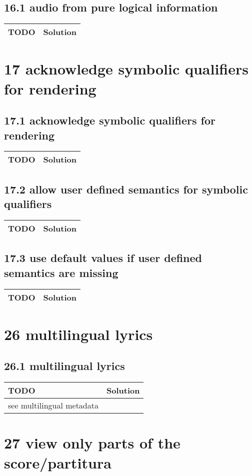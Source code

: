  \subsection*{16.1 audio from pure logical information}
 \begin{tabular}{|p{}|p{}|}
 \hline
 \textbf{TODO} &
 \textbf{Solution} 
\\
 \hline
 \end{tabular} \section*{17 acknowledge symbolic qualifiers for rendering}
 \subsection*{17.1 acknowledge symbolic qualifiers for rendering}
 \begin{tabular}{|p{}|p{}|}
 \hline
 \textbf{TODO} &
 \textbf{Solution} 
\\
 \hline
 \end{tabular} \subsection*{17.2 allow user defined semantics for symbolic qualifiers}
 \begin{tabular}{|p{}|p{}|}
 \hline
 \textbf{TODO} &
 \textbf{Solution} 
\\
 \hline
 \end{tabular} \subsection*{17.3 use default values if user defined semantics are missing}
 \begin{tabular}{|p{}|p{}|}
 \hline
 \textbf{TODO} &
 \textbf{Solution} 
\\
 \hline
 \end{tabular} \section*{26 multilingual lyrics}
 \subsection*{26.1 multilingual lyrics}
 \begin{tabular}{|p{}|p{}|}
 \hline
 \textbf{TODO} &
 \textbf{Solution} 
\\
 \hline
	see multilingual metadata &
  
\\ 	\hline
 \end{tabular} \section*{27 view only parts of the score/partitura}
